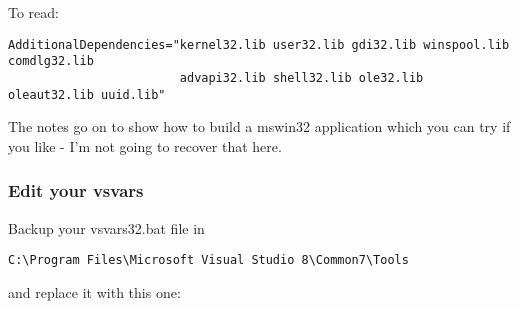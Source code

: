 To read:

\begin{verbatim}
AdditionalDependencies="kernel32.lib user32.lib gdi32.lib winspool.lib comdlg32.lib 
                        advapi32.lib shell32.lib ole32.lib oleaut32.lib uuid.lib"
\end{verbatim}

The notes go on to show how to build a mswin32 application which you can try if you like - 
I'm not going to recover that here.

\hypertarget{toc96}{}
\subsubsection{Edit your vsvars}
Backup your vsvars32.bat file in 

\begin{verbatim}
C:\Program Files\Microsoft Visual Studio 8\Common7\Tools
\end{verbatim}

and replace it with this one:

